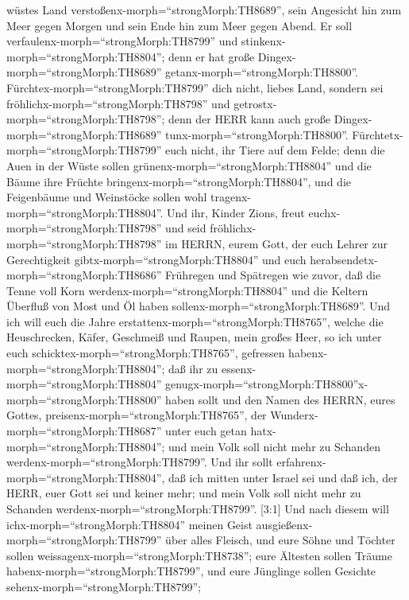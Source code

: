 wüstes Land verstoßenx-morph=``strongMorph:TH8689'', sein Angesicht hin
zum Meer gegen Morgen und sein Ende hin zum Meer gegen Abend. Er soll
verfaulenx-morph=``strongMorph:TH8799'' und
stinkenx-morph=``strongMorph:TH8804''; denn er hat große
Dingex-morph=``strongMorph:TH8689'' getanx-morph=``strongMorph:TH8800''.
 Fürchtex-morph=``strongMorph:TH8799'' dich nicht, liebes
Land, sondern sei fröhlichx-morph=``strongMorph:TH8798'' und
getrostx-morph=``strongMorph:TH8798''; denn der HERR kann auch große
Dingex-morph=``strongMorph:TH8689'' tunx-morph=``strongMorph:TH8800''.
 Fürchtetx-morph=``strongMorph:TH8799'' euch nicht, ihr
Tiere auf dem Felde; denn die Auen in der Wüste sollen
grünenx-morph=``strongMorph:TH8804'' und die Bäume ihre Früchte
bringenx-morph=``strongMorph:TH8804'', und die Feigenbäume und
Weinstöcke sollen wohl tragenx-morph=``strongMorph:TH8804''.
 Und ihr, Kinder Zions, freut
euchx-morph=``strongMorph:TH8798'' und seid
fröhlichx-morph=``strongMorph:TH8798'' im HERRN, eurem Gott, der euch
Lehrer zur Gerechtigkeit gibtx-morph=``strongMorph:TH8804'' und euch
herabsendetx-morph=``strongMorph:TH8686'' Frühregen und Spätregen wie
zuvor,  daß die Tenne voll Korn
werdenx-morph=``strongMorph:TH8804'' und die Keltern Überfluß von Most
und Öl haben sollenx-morph=``strongMorph:TH8689''.  Und ich
will euch die Jahre erstattenx-morph=``strongMorph:TH8765'', welche die
Heuschrecken, Käfer, Geschmeiß und Raupen, mein großes Heer, so ich
unter euch schicktex-morph=``strongMorph:TH8765'', gefressen
habenx-morph=``strongMorph:TH8804'';  daß ihr zu
essenx-morph=``strongMorph:TH8804''
genugx-morph=``strongMorph:TH8800''x-morph=``strongMorph:TH8800'' haben
sollt und den Namen des HERRN, eures Gottes,
preisenx-morph=``strongMorph:TH8765'', der
Wunderx-morph=``strongMorph:TH8687'' unter euch getan
hatx-morph=``strongMorph:TH8804''; und mein Volk soll nicht mehr zu
Schanden werdenx-morph=``strongMorph:TH8799''.  Und ihr
sollt erfahrenx-morph=``strongMorph:TH8804'', daß ich mitten unter
Israel sei und daß ich, der HERR, euer Gott sei und keiner mehr; und
mein Volk soll nicht mehr zu Schanden
werdenx-morph=``strongMorph:TH8799''.  {[}3:1{]} Und nach
diesem will ichx-morph=``strongMorph:TH8804'' meinen Geist
ausgießenx-morph=``strongMorph:TH8799'' über alles Fleisch, und eure
Söhne und Töchter sollen weissagenx-morph=``strongMorph:TH8738''; eure
Ältesten sollen Träume habenx-morph=``strongMorph:TH8799'', und eure
Jünglinge sollen Gesichte sehenx-morph=``strongMorph:TH8799'';
